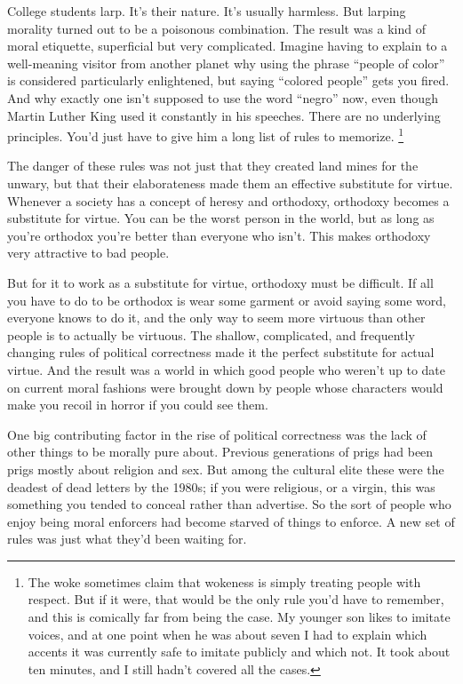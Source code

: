 \documentclass[12pt]{book}
\begin{document}
College students larp. It's their nature. It's usually harmless. But
larping morality turned out to be a poisonous combination. The result
was a kind of moral etiquette, superficial but very complicated. Imagine
having to explain to a well-meaning visitor from another planet why
using the phrase ``people of color'' is considered particularly
enlightened, but saying ``colored people'' gets you fired. And why
exactly one isn't supposed to use the word ``negro'' now, even though
Martin Luther King used it constantly in his speeches. There are no
underlying principles. You'd just have to give him a long list of rules
to memorize. \footnote{The woke sometimes claim that wokeness is simply treating people
with respect. But if it were, that would be the only rule you'd have to
remember, and this is comically far from being the case. My younger son
likes to imitate voices, and at one point when he was about seven I had
to explain which accents it was currently safe to imitate publicly and
which not. It took about ten minutes, and I still hadn't covered all the
cases.}

The danger of these rules was not just that they created land mines for
the unwary, but that their elaborateness made them an effective
substitute for virtue. Whenever a society has a concept of heresy and
orthodoxy, orthodoxy becomes a substitute for virtue. You can be the
worst person in the world, but as long as you're orthodox you're better
than everyone who isn't. This makes orthodoxy very attractive to bad
people.

But for it to work as a substitute for virtue, orthodoxy must be
difficult. If all you have to do to be orthodox is wear some garment or
avoid saying some word, everyone knows to do it, and the only way to
seem more virtuous than other people is to actually be virtuous. The
shallow, complicated, and frequently changing rules of political
correctness made it the perfect substitute for actual virtue. And the
result was a world in which good people who weren't up to date on
current moral fashions were brought down by people whose characters
would make you recoil in horror if you could see them.

One big contributing factor in the rise of political correctness was the
lack of other things to be morally pure about. Previous generations of
prigs had been prigs mostly about religion and sex. But among the
cultural elite these were the deadest of dead letters by the 1980s; if
you were religious, or a virgin, this was something you tended to
conceal rather than advertise. So the sort of people who enjoy being
moral enforcers had become starved of things to enforce. A new set of
rules was just what they'd been waiting for.
\end{document}
